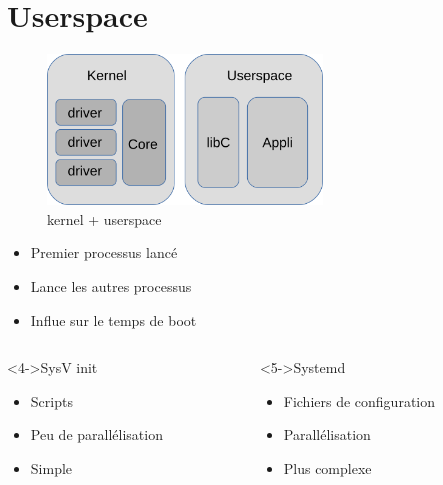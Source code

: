 \section{Userspace}
	\begin{frame}
		\begin{figure}
		\includegraphics[height=4cm]{img/arch_linux_full.png}
		\caption{kernel + userspace}
		\end{figure}
	\end{frame}
	\begin{frame}
		\begin{itemize}
			\item<1-> Premier processus lancé
			\item<2-> Lance les autres processus
			\item<3-> Influe sur le temps de boot
		\end{itemize}
		\begin{columns}[t]
			\begin{column}{0.48\textwidth}
				\begin{block}<4->{SysV init}
					\begin{itemize}
						\item Scripts
						\item Peu de parallélisation
						\item Simple
					\end{itemize}
				\end{block}
			\end{column}
			\begin{column}{0.48\textwidth}
				\begin{block}<5->{Systemd}
					\begin{itemize}
						\item Fichiers de configuration
						\item Parallélisation
						\item Plus complexe
					\end{itemize}
				\end{block}
			\end{column}
		\end{columns}
	\end{frame}

